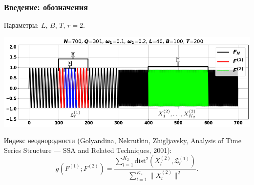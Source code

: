 \documentclass[pdf, 9pt,intlimits, unicode]{beamer}
\DeclareMathOperator{\mathspan}{span}
\newcommand\eqdef{\mathrel{\stackrel{\makebox[0pt]{\mbox{\normalfont\tiny def}}}{=}}}
\begin{document}
	\begin{frame}
		\frametitle{Введение: обозначения}	
		{\color{blue} Параметры:} $ L $, $ B $, $ T $, $ r = 2 $.
		\begin{center}
			\includegraphics[width=\linewidth]{imgs/designations}
		\end{center}

		\bigskip
		
		{\color{blue} Индекс неоднородности} (Golyandina, Nekrutkin, Zhigljavsky, Analysis of Time Series Structure --- SSA and Related Techniques, 2001):
		\small{
			$$ g(F^{(1)}; F^{(2)}) = \frac{\sum\limits_{l=1}^{K_2}\mathrm{dist}^2(X_l^{(2)}, \mathfrak{L}_r^{(1)})}{\sum\limits_{l=1}^{K_2}\|X_l^{(2)}\|^2}. $$
		}
	\end{frame}
\end{document}
